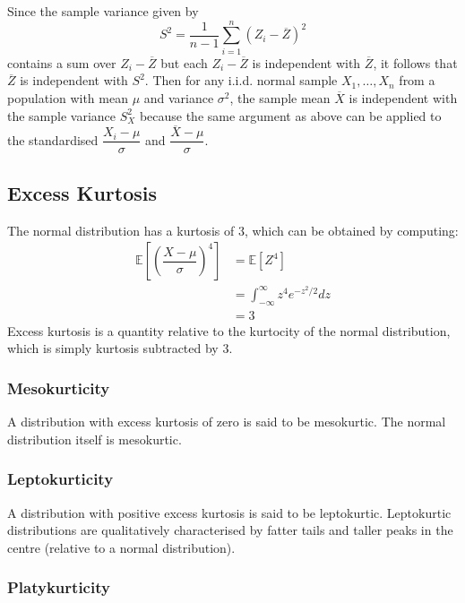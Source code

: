 \documentclass[11pt]{report} %
\begin{document}
Since the sample variance given by
\begin{equation}
S^{2} = \frac{1}{n - 1}\sum_{i = 1}^{n}\left(Z_{i} - \overline{Z}\right)^{2}
\end{equation}
contains a sum over $Z_{i} - \overline{Z}$ but each $Z_{i} - \overline{Z}$ is independent with $\overline{Z}$, it follows that $\overline{Z}$ is independent with $S^{2}$. Then for any i.i.d. normal sample $X_{1}, \dots, X_{n}$ from a population with mean $\mu$ and variance $\sigma^{2}$, the sample mean $\overline{X}$ is independent with the sample variance $S_{X}^{2}$ because the same argument as above can be applied to the standardised $\dfrac{X_{i} - \mu}{\sigma}$ and $\dfrac{\overline{X} - \mu}{\sigma}$.

\subsection{Excess Kurtosis}

The normal distribution has a kurtosis of $3$, which can be obtained by computing:
\begin{align}
\mathbb{E}\left[\left(\dfrac{X - \mu}{\sigma}\right)^{4}\right] &= \mathbb{E}\left[Z^{4}\right] \\
&= \int_{-\infty}^{\infty}z^{4}e^{-z^{2}/2}dz \\
&= 3
\end{align}
Excess kurtosis is a quantity relative to the kurtocity of the normal distribution, which is simply kurtosis subtracted by $3$.

\subsubsection{Mesokurticity}

A distribution with excess kurtosis of zero is said to be mesokurtic. The normal distribution itself is mesokurtic.

\subsubsection{Leptokurticity}

A distribution with positive excess kurtosis is said to be leptokurtic. Leptokurtic distributions are qualitatively characterised by fatter tails and taller peaks in the centre (relative to a normal distribution).

\subsubsection{Platykurticity}
\end{document}

